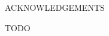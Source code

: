 \label{chap:acknowledgements}

\begin{center}
  \uppercase{Acknowledgements}
\end{center}

\bigskip


TODO


\newpage